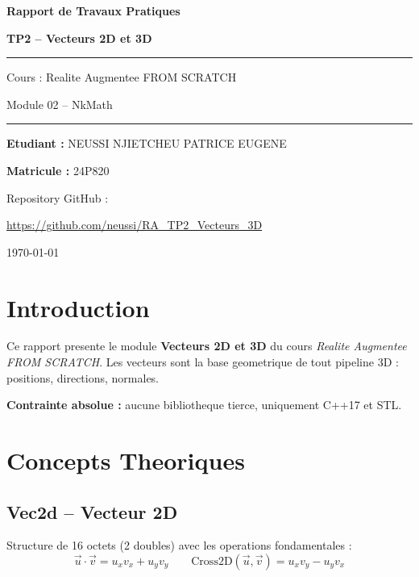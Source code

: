 \documentclass[12pt,a4paper]{article}
\begin{document}
\begin{titlepage}
    \centering
    \vspace*{2cm}
    {\huge\bfseries Rapport de Travaux Pratiques\par}
    \vspace{1cm}
    {\LARGE\bfseries\color{codeblue} TP2 -- Vecteurs 2D et 3D\par}
    \vspace{1.5cm}
    \rule{\linewidth}{0.5pt}\vspace{0.5cm}
    {\large Cours : Realite Augmentee FROM SCRATCH\par}
    {\large Module 02 -- NkMath\par}
    \vspace{0.5cm}\rule{\linewidth}{0.5pt}
    \vspace{2cm}
    {\large\textbf{Etudiant :} NEUSSI NJIETCHEU PATRICE EUGENE\par}
    {\large\textbf{Matricule :} 24P820\par}
    \vspace{2cm}
    {\large Repository GitHub :\par}
    \href{https://github.com/neussi/RA_TP2_Vecteurs_3D}{https://github.com/neussi/RA\_TP2\_Vecteurs\_3D}
    \vfill
    {\large \today\par}
\end{titlepage}

\tableofcontents
\newpage

\section{Introduction}

Ce rapport presente le module \textbf{Vecteurs 2D et 3D} du cours \textit{Realite Augmentee FROM SCRATCH}.
Les vecteurs sont la base geometrique de tout pipeline 3D : positions, directions, normales.

\textbf{Contrainte absolue :} aucune bibliotheque tierce, uniquement C++17 et STL.

\section{Concepts Theoriques}

\subsection{Vec2d -- Vecteur 2D}

Structure de 16 octets (2 doubles) avec les operations fondamentales :
\[
    \vec{u} \cdot \vec{v} = u_x v_x + u_y v_y \qquad
    \text{Cross2D}(\vec{u},\vec{v}) = u_x v_y - u_y v_x
\]
\end{document}
